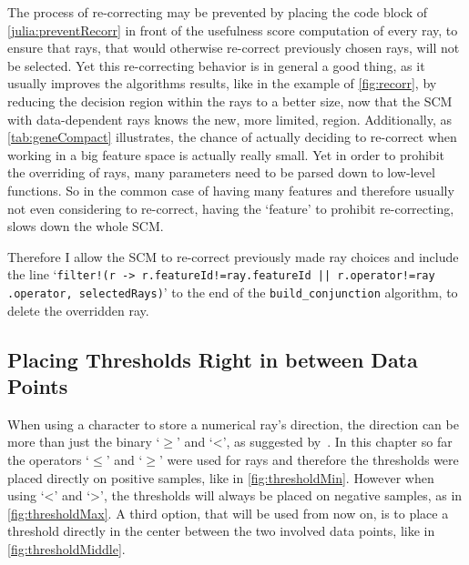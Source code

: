 The process of re-correcting may be prevented by placing the code block of \autoref{julia:preventRecorr} in front of
the usefulness score computation of every ray, to ensure that rays, that would otherwise re-correct
previously chosen rays, will not be selected.
Yet this re-correcting behavior is in general a good thing, as it usually improves the algorithms results,
like in the example of \autoref{fig:recorr}, by reducing the decision region within the rays
to a better size, now that the SCM with data-dependent rays knows the new, more limited, region.
Additionally, as \autoref{tab:geneCompact} illustrates, the chance of actually deciding to re-correct
when working in a big feature space is actually really small.
Yet in order to prohibit the overriding of rays, many parameters need to be parsed down to low-level functions.
So in the common case of having many features and therefore usually not even considering to re-correct, having
the `feature' to prohibit re-correcting, slows down the whole SCM.\

Therefore I allow the SCM to re-correct previously made ray choices and
include the line `\texttt{filter!(r -> r.featureId!=ray.featureId || r.operator!=ray\\.operator, selectedRays)}'
to the end of the \texttt{build\_conjunction} algorithm, to delete the overridden ray.

\subsection{Placing Thresholds Right in between Data Points}

When using a character to store a numerical ray's direction, the direction can be more than just the binary `\(\geq\)' and `<', as suggested by~\cite{kestler11}.
In this chapter so far the operators `\(\leq\)' and `\(\geq\)' were used for rays
and therefore the thresholds were placed directly on positive samples, like in \autoref{fig:thresholdMin}.
However when using `<' and `>', the thresholds will always be placed on negative samples, as in \autoref{fig:thresholdMax}.
A third option, that will be used from now on, is to place a threshold directly in the center
between the two involved data points, like in \autoref{fig:thresholdMiddle}.

